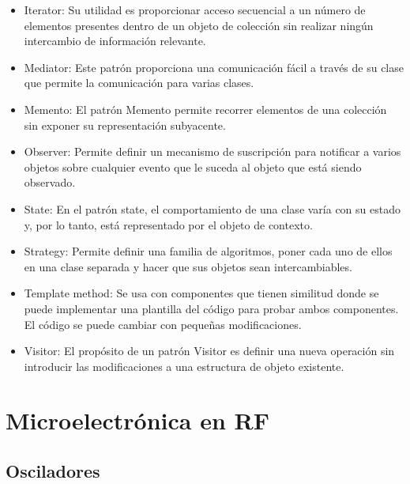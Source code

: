 \documentclass[
	12pt, %
	fleqn, %
	a4paper, %
	oneside, %
]{LegrandOrangeBook}
\begin{document}
\begin{itemize}
\begin{itemize}
\item Iterator: Su utilidad es proporcionar acceso secuencial a un número de elementos presentes dentro de un objeto de colección sin realizar ningún intercambio de información relevante.
\item Mediator: Este patrón proporciona una comunicación fácil a través de su clase que permite la comunicación para varias clases.
\item Memento: El patrón Memento permite recorrer elementos de una colección sin exponer su representación subyacente.
\item Observer: Permite definir un mecanismo de suscripción para notificar a varios objetos sobre cualquier evento que le suceda al objeto que está siendo observado.
\item State: En el patrón state, el comportamiento de una clase varía con su estado y, por lo tanto, está representado por el objeto de contexto.
\item Strategy: Permite definir una familia de algoritmos, poner cada uno de ellos en una clase separada y hacer que sus objetos sean intercambiables.
\item Template method: Se usa con componentes que tienen similitud donde se puede implementar una plantilla del código para probar ambos componentes. El código se puede cambiar con pequeñas modificaciones.
\item Visitor: El propósito de un patrón Visitor es definir una nueva operación sin introducir las modificaciones a una estructura de objeto existente.
\end{itemize}
\end{itemize}
\part{Microelectrónica en RF}
\chapter{Osciladores}
\end{document}
